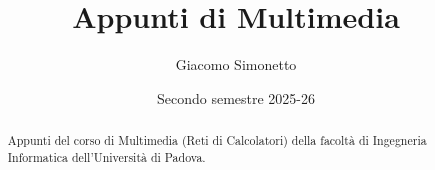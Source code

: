 \documentclass[a4paper]{article}
\title{Appunti di Multimedia}
\author{Giacomo Simonetto}
\date{Secondo semestre 2025-26}
\begin{document}
\maketitle
\begin{abstract}
	Appunti del corso di Multimedia (Reti di Calcolatori) della facoltà di Ingegneria Informatica dell'Università di Padova.
\end{abstract}

\newpage

\tableofcontents

\newpage










\end{document}
